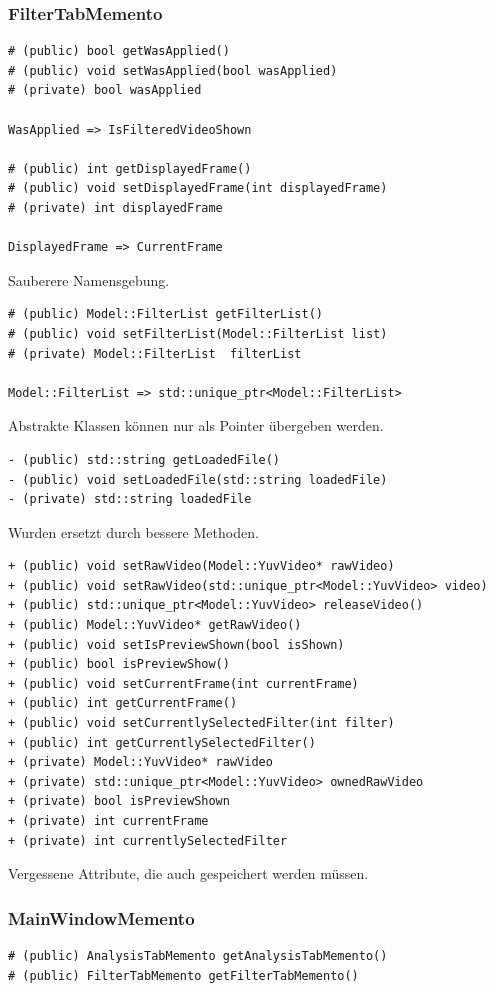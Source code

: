 \documentclass{scrartcl}
\begin{document}
{\subsubsection{FilterTabMemento}
\bigskip
\begin{verbatim}
# (public) bool getWasApplied()
# (public) void setWasApplied(bool wasApplied)
# (private) bool wasApplied

WasApplied => IsFilteredVideoShown

# (public) int getDisplayedFrame()
# (public) void setDisplayedFrame(int displayedFrame)
# (private) int displayedFrame

DisplayedFrame => CurrentFrame
\end{verbatim}
Sauberere Namensgebung.
\bigskip
\begin{verbatim}
# (public) Model::FilterList getFilterList()
# (public) void setFilterList(Model::FilterList list)
# (private) Model::FilterList  filterList

Model::FilterList => std::unique_ptr<Model::FilterList>
\end{verbatim}
Abstrakte Klassen können nur als Pointer übergeben werden.
\bigskip
\begin{verbatim}
- (public) std::string getLoadedFile()
- (public) void setLoadedFile(std::string loadedFile)
- (private) std::string loadedFile
\end{verbatim}
Wurden ersetzt durch bessere Methoden.
\bigskip
\begin{verbatim}
+ (public) void setRawVideo(Model::YuvVideo* rawVideo)
+ (public) void setRawVideo(std::unique_ptr<Model::YuvVideo> video)
+ (public) std::unique_ptr<Model::YuvVideo> releaseVideo()
+ (public) Model::YuvVideo* getRawVideo()
+ (public) void setIsPreviewShown(bool isShown)
+ (public) bool isPreviewShow()
+ (public) void setCurrentFrame(int currentFrame)
+ (public) int getCurrentFrame()
+ (public) void setCurrentlySelectedFilter(int filter)
+ (public) int getCurrentlySelectedFilter()
+ (private) Model::YuvVideo* rawVideo
+ (private) std::unique_ptr<Model::YuvVideo> ownedRawVideo
+ (private) bool isPreviewShown
+ (private) int currentFrame
+ (private) int currentlySelectedFilter
\end{verbatim}
Vergessene Attribute, die auch gespeichert werden müssen.
\newpage
\subsubsection{MainWindowMemento}
\bigskip
\begin{verbatim}
# (public) AnalysisTabMemento getAnalysisTabMemento()
# (public) FilterTabMemento getFilterTabMemento()


\end{verbatim}}
\end{document}

